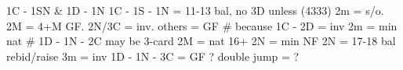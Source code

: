 1C - 1SN & 1D - 1N
1C - 1S - 1N = 11-13 bal, no 3D unless (4333)
    2m = s/o. 2M = 4+M GF. 2N/3C = inv. others = GF
    # because 1C - 2D = inv
2m = min nat  # 1D - 1N - 2C may be 3-card
2M = nat 16+
    2N = min NF
2N = 17-18 bal
rebid/raise 3m = inv
1D - 1N - 3C = GF ?
double jump = ?